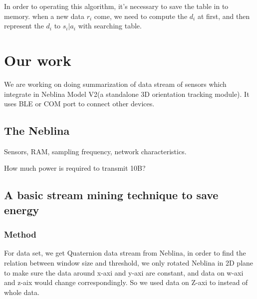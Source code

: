 \documentclass{report}
\begin{document}

In order to operating this algorithm, it’s necessary to save the table in to memory. when a new data $r_i$ come, we need to compute the $d_i$ at first, and then represent the $d_i$ to $s_i|a_i$ with searching table.




\chapter{Our work}
We are working on doing summarization of data stream of sensors which integrate in Neblina Model V2(a standalone 3D orientation tracking module). It uses BLE or COM port to connect other devices.

\section{The Neblina}

Sensors, RAM, sampling frequency, network characteristics.

How much power is required to transmit 10B? 

\section{A basic stream mining technique to save energy}

\subsection{Method}
For data set, we get Quaternion data stream from Neblina, in order to find the relation between window size and threshold, we only rotated Neblina in 2D plane to make sure the data around x-axi and y-axi are constant, and data on w-axi and z-aix would change correspondingly. So we used data on Z-axi to instead of whole data.
\end{document}
